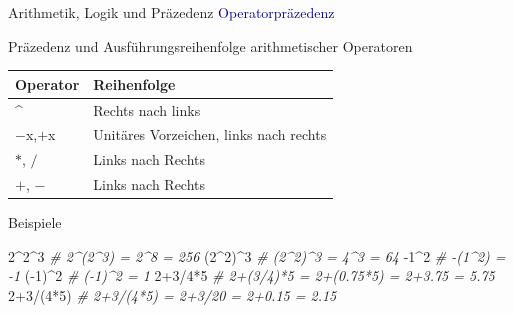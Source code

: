 \documentclass[
  8pt,
  ignorenonframetext,
]{beamer}
\newenvironment{Shaded}{\begin{snugshade}}{\end{snugshade}}
\newcommand{\CommentTok}[1]{\textcolor[rgb]{0.56,0.35,0.01}{\textit{#1}}}
\newcommand{\DecValTok}[1]{\textcolor[rgb]{0.00,0.00,0.81}{#1}}
\newcommand{\NormalTok}[1]{#1}
\newcommand{\SpecialCharTok}[1]{\textcolor[rgb]{0.00,0.00,0.00}{#1}}
\begin{document}
\begin{frame}[fragile]{Arithmetik, Logik und Präzedenz}
\protect\hypertarget{arithmetik-logik-und-pruxe4zedenz-5}{}
\textcolor{darkblue}{Operatorpräzedenz}

Präzedenz und Ausführungsreihenfolge arithmetischer Operatoren

\small

\begin{center}
\begin{tabular}{l|l}
Operator            & Reihenfolge                               \\\hline
\^{}                & Rechts nach links                         \\
$-$x,$+$x           & Unitäres Vorzeichen, links nach rechts    \\
$*$, $/$            & Links nach Rechts                         \\
$+$, $-$            & Links nach Rechts                         \\
\end{tabular}
\end{center}

Beispiele \footnotesize

\begin{Shaded}
\begin{Highlighting}[]
\DecValTok{2}\SpecialCharTok{\^{}}\DecValTok{2}\SpecialCharTok{\^{}}\DecValTok{3}           \CommentTok{\# 2\^{}(2\^{}3)   = 2\^{}8 = 256}
\NormalTok{(}\DecValTok{2}\SpecialCharTok{\^{}}\DecValTok{2}\NormalTok{)}\SpecialCharTok{\^{}}\DecValTok{3}         \CommentTok{\# (2\^{}2)\^{}3   = 4\^{}3 = 64}
\SpecialCharTok{{-}}\DecValTok{1}\SpecialCharTok{\^{}}\DecValTok{2}            \CommentTok{\# {-}(1\^{}2)    = {-}1}
\NormalTok{(}\SpecialCharTok{{-}}\DecValTok{1}\NormalTok{)}\SpecialCharTok{\^{}}\DecValTok{2}          \CommentTok{\# ({-}1)\^{}2    =  1}
\DecValTok{2}\SpecialCharTok{+}\DecValTok{3}\SpecialCharTok{/}\DecValTok{4}\SpecialCharTok{*}\DecValTok{5}         \CommentTok{\# 2+(3/4)*5 = 2+(0.75*5) = 2+3.75 = 5.75}
\DecValTok{2}\SpecialCharTok{+}\DecValTok{3}\SpecialCharTok{/}\NormalTok{(}\DecValTok{4}\SpecialCharTok{*}\DecValTok{5}\NormalTok{)       }\CommentTok{\# 2+3/(4*5) = 2+3/20 = 2+0.15 = 2.15}
\end{Highlighting}
\end{Shaded}
\end{frame}
\end{document}
